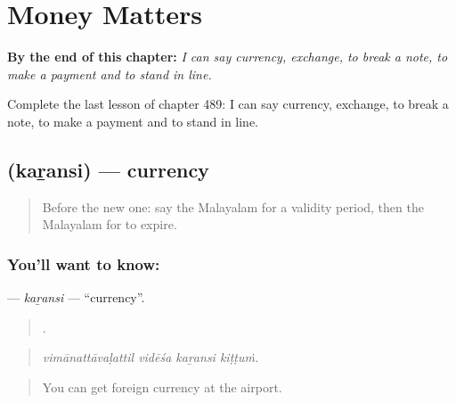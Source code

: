 
\chapter{Money Matters}
\label{ch:ml-money-matters}

\begin{chapteropening}
\textbf{By the end of this chapter:} \emph{I can say currency, exchange, to break a note, to make a payment and to stand in line.}

Complete the last lesson of chapter 489: I can say currency, exchange, to break a note, to make a payment and to stand in line.
\end{chapteropening}

\section[\texorpdfstring{\ml{കറൻസി} (kaṟansi)}{കറൻസി (kaṟansi)}]{ (kaṟansi) — currency}

\label{lesson:ML-C489-karansi}



\begin{quote}
Before the new one: say the Malayalam for a validity period, then the Malayalam for to expire.
\end{quote}

\subsection*{You'll want to know: }
\textbf{} — \emph{kaṟansi} — \textquotedblleft{}currency\textquotedblright{}.

\begin{quote}
   .
\end{quote}

\begin{quote}
\emph{vimānattāvaḷattil vidēśa kaṟansi kiṭṭuṁ.}
\end{quote}

\begin{quote}
You can get foreign currency at the airport.
\end{quote}

